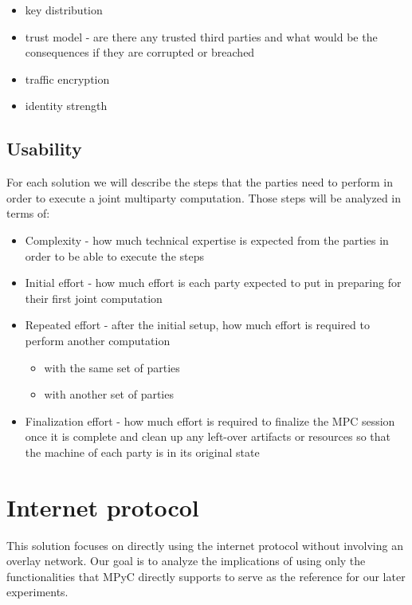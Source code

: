 \begin{itemize}
\tightlist
\item
  key distribution
\item
  trust model - are there any trusted third parties and what would be
  the consequences if they are corrupted or breached
\item
  traffic encryption
\item
  identity strength
\end{itemize}

\hypertarget{usability}{%
\section{Usability}\label{usability}}

For each solution we will describe the steps that the parties need to
perform in order to execute a joint multiparty computation. Those steps
will be analyzed in terms of:

\begin{itemize}
\tightlist
\item
  Complexity - how much technical expertise is expected from the parties
  in order to be able to execute the steps
\item
  Initial effort - how much effort is each party expected to put in
  preparing for their first joint computation
\item
  Repeated effort - after the initial setup, how much effort is required
  to perform another computation

  \begin{itemize}
  \tightlist
  \item
    with the same set of parties
  \item
    with another set of parties
  \end{itemize}
\item
  Finalization effort - how much effort is required to finalize the MPC
  session once it is complete and clean up any left-over artifacts or
  resources so that the machine of each party is in its original state
\end{itemize}

\hypertarget{internet-protocol}{%
\chapter{Internet protocol}\label{internet-protocol}}

This solution focuses on directly using the internet protocol without
involving an overlay network. Our goal is to analyze the implications of
using only the functionalities that MPyC directly supports to serve as
the reference for our later experiments.


